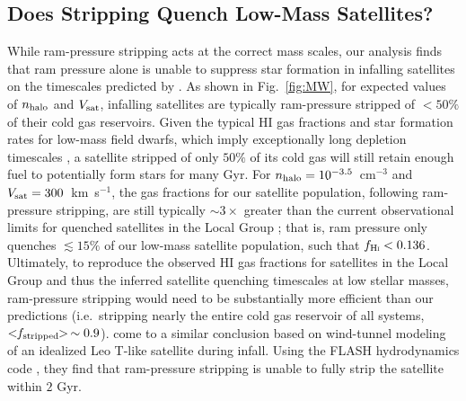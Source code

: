 

\subsection{Does Stripping Quench Low-Mass Satellites?}
\label{subsec:efficacy}


While ram-pressure stripping acts at the correct mass scales, our
analysis finds that ram pressure alone is unable to suppress star
formation in infalling satellites on the timescales predicted by
\citet{fham15}.
%
As shown in Fig.~\ref{fig:MW}, for expected values of $n_{\rm
  halo}$ and $V_{\rm sat}$, infalling satellites are typically
ram-pressure stripped of $<50\%$ of their cold gas reservoirs.
%
Given the typical H{\scriptsize I} gas fractions and star formation
rates for low-mass field dwarfs, which imply exceptionally long
depletion timescales \citep{skillman03, geha06, schiminovich10}, a
satellite stripped of only $50\%$ of its cold gas will still retain
enough fuel to potentially form stars for many Gyr. 
%
For $n_{\rm halo} = 10^{-3.5}$~cm$^{-3}$ and $V_{\rm sat} =
300$~km~s$^{-1}$, the gas fractions for our satellite population,
following ram-pressure stripping, are still typically $\sim3\times$
greater than the current observational limits for quenched satellites
in the Local Group \citep[i.e.~$f_{\rm H\scalebox{0.45}{\rm
    I}}\lesssim0.136$,][]{spekkens14}; 
%
that is, ram pressure only quenches $\lesssim15\%$ of our low-mass
satellite population, such that $f_{\rm H\scalebox{0.45}{\rm I}} < 0.136$.
%
Ultimately, to reproduce the observed H{\scriptsize I} gas fractions
for satellites in the Local Group and thus the inferred satellite
quenching timescales at low stellar masses, ram-pressure stripping
would need to be substantially more efficient than our predictions
(i.e.~stripping nearly the entire cold gas reservoir of all
systems, $<\!\!f_{\rm stripped}\!\!> \, \sim 0.9$).
%
\citet{emerick16} come to a similar conclusion based on wind-tunnel
modeling of an idealized Leo T-like satellite during infall.
Using the FLASH hydrodynamics code \citep{fryxell00}, they find that
ram-pressure stripping is unable to fully strip the satellite within
$2$ Gyr. 


